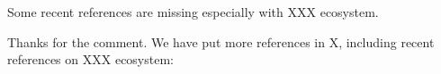 \documentclass{ar2rc}
\begin{document}
\RC
Some recent references are missing especially with XXX ecosystem.

%
\AR
Thanks for the comment.
We have put more references in X, 
including recent references on XXX ecosystem:






\end{document}
